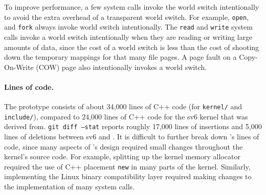 To improve performance, a few system calls invoke the world switch
intentionally to avoid the extra overhead of a transparent world switch.
For example, \texttt{open}, and \texttt{fork} always
invoke world switch intentionally.  The \texttt{read} and \texttt{write}
system calls invoke a world switch intentionally when they are reading
or writing large amounts of data, since the cost of a world switch is
less than the cost of shooting down the temporary mappings for that many
file pages.  A page fault on a Copy-On-Write (COW) page also intentionally
invokes a world switch.


\paragraph{Lines of code.}

The \sys prototype consists of about 34,000 lines of C++ code (for
\texttt{kernel/} and \texttt{include/}), compared to 24,000 lines of
C++ code for the sv6 kernel that \sys was derived from.
\texttt{git diff --stat} reports roughly 17,000 lines of insertions and 5,000
lines of deletions between sv6 and \sys.
It is difficult to further
break down \sys's lines of code, since many aspects of \sys's design
required small changes throughout the kernel's source code.  For
example, splitting up the kernel memory allocator required the use of
C++ placement \texttt{new} in many parts of the kernel.  Similarly,
implementing the Linux binary compatibility layer required making
changes to the implementation of many system calls.

